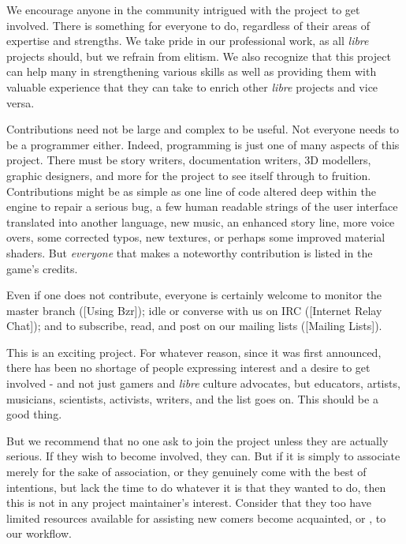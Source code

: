 
We encourage anyone in the community intrigued with the project to get involved. There is something for everyone to do, regardless of their areas of expertise and strengths. We take pride in our professional work, as all {\it libre} projects should, but we refrain from elitism. We also recognize that this project can help many in strengthening various skills as well as providing them with valuable experience that they can take to enrich other {\it libre} projects and vice versa.

Contributions need not be large and complex to be useful. Not everyone needs to be a programmer either. Indeed, programming is just one of many aspects of this project. There must be story writers, documentation writers, 3D modellers, graphic designers, and more for the project to see itself through to fruition. Contributions might be as simple as one line of code altered deep within the engine to repair a serious bug, a few human readable strings of the user interface translated into another language, new music, an enhanced story line, more voice overs, some corrected typos, new textures, or perhaps some improved material shaders. But {\it everyone} that makes a noteworthy contribution is listed in the game's credits.

Even if one does not contribute, everyone is certainly welcome to monitor the master branch ([Using Bzr]); idle or converse with us on IRC ([Internet Relay Chat]); and to subscribe, read, and post on our mailing lists ([Mailing Lists]).

This is an exciting project. For whatever reason, since it was first announced, there has been no shortage of people expressing interest and a desire to get involved - and not just gamers and {\it libre} culture advocates, but educators, artists, musicians, scientists, activists, writers, and the list goes on. This should be a good thing. 

But we recommend that no one ask to join the project unless they are actually serious. If they wish to become involved, they can. But if it is simply to associate merely for the sake of association, or they genuinely come with the best of intentions, but lack the time to do whatever it is that they wanted to do, then this is not in any project maintainer's interest. Consider that they too have limited resources available for assisting new comers become acquainted, or , to our workflow.

